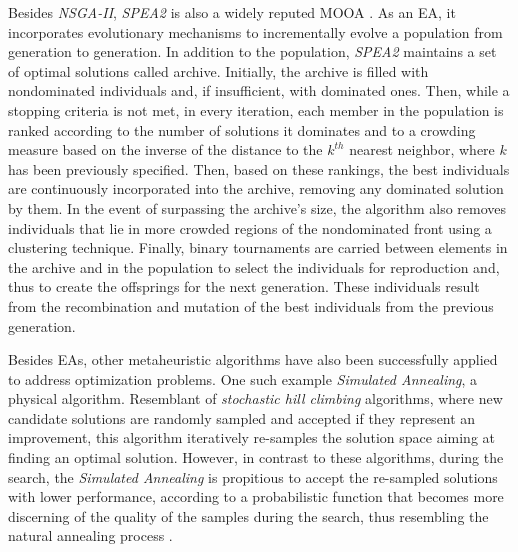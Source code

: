 	Besides \textit{\ac{NSGA-II}}, \textit{\ac{SPEA2}} is also a widely reputed \ac{MOOA} \cite{Zitzler2001SPEA2}. As an \ac{EA}, it incorporates evolutionary mechanisms to incrementally evolve a population from generation to generation. In addition to the population, \textit{\ac{SPEA2}} maintains a set of optimal solutions called archive. Initially, the archive is filled with nondominated individuals and, if insufficient, with dominated ones. Then, while a stopping criteria is not met, in every iteration, each member in the population is ranked according to the number of solutions it dominates and to a crowding measure based on the inverse of the distance to the $k^{th}$ nearest neighbor, where $k$ has been previously specified. 
	Then, based on these rankings, the best individuals are continuously incorporated into the archive, removing any dominated solution by them. In the event of surpassing the archive's size, the algorithm also removes individuals that lie in more crowded regions of the nondominated front using a clustering technique. Finally, binary tournaments are carried between elements in the archive and in the population to select the individuals for reproduction and, thus to create the offsprings for the next generation. These individuals result from the recombination and mutation of the best individuals from the previous generation. 
		
	Besides \acp{EA}, other metaheuristic algorithms have also been successfully applied to address optimization problems. One such example \textit{Simulated Annealing}, a physical algorithm. Resemblant of \textit{stochastic hill climbing} algorithms, where new candidate solutions are randomly sampled and accepted if they represent an improvement, this algorithm iteratively re-samples the solution space aiming at finding an optimal solution. However, in contrast to these algorithms, during the search, the \textit{Simulated Annealing} is propitious to accept the re-sampled solutions with lower performance, according to a probabilistic function that becomes more discerning of the quality of the samples during the search, thus resembling the natural annealing process \cite{Brownlee2011}. 
	
